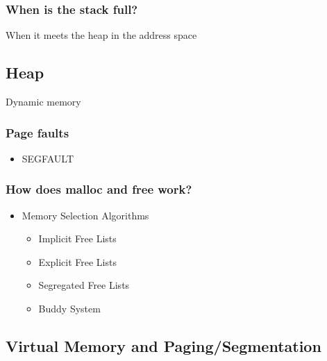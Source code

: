 \documentclass[11pt]{article}
\begin{document}
\subsubsection{When is the stack full?}
\label{sec-5.3.1}

    When it meets the heap in the address space
\subsection{Heap}
\label{sec-5.4}

   Dynamic memory
\subsubsection{Page faults}
\label{sec-5.4.1}

\begin{itemize}

\item SEGFAULT\\
\label{sec-5.4.1.1}

\end{itemize} %
\subsubsection{How does malloc and free work?}
\label{sec-5.4.2}

\begin{itemize}

\item Memory Selection Algorithms\\
\label{sec-5.4.2.1}

\begin{itemize}

\item Implicit Free Lists\\
\label{sec-5.4.2.1.1}


\item Explicit Free Lists\\
\label{sec-5.4.2.1.2}


\item Segregated Free Lists\\
\label{sec-5.4.2.1.3}


\item Buddy System\\
\label{sec-5.4.2.1.4}

\end{itemize} %
\end{itemize} %
\subsection{Virtual Memory and Paging/Segmentation}
\label{sec-5.5}
\end{document}
